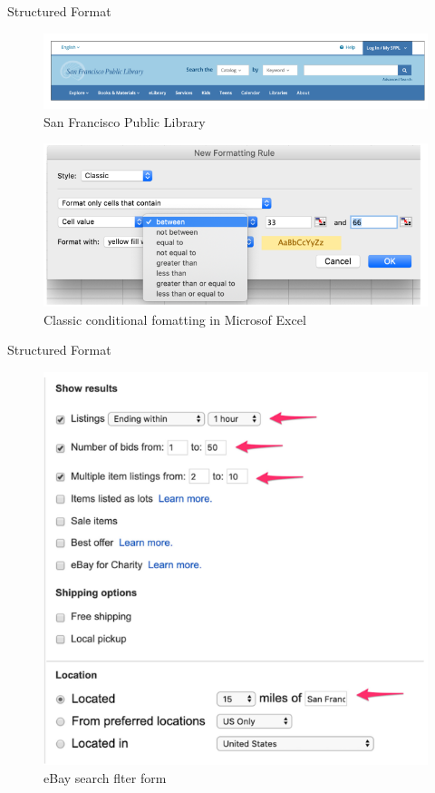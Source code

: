 \documentclass{beamer}
\begin{document}
\begin{frame}[t]{Structured Format}
	\begin{figure}[h]
		\centering
		\includegraphics[scale=0.4]{images/lec08-pic37.png}
		\caption{San Francisco Public Library}
	\end{figure}

	\begin{figure}[h]
		\centering
		\includegraphics[scale=0.4]{images/lec08-pic38.png}
		\caption{Classic conditional fomatting in Microsof Excel}
	\end{figure}
\end{frame}

\begin{frame}[t]{Structured Format}
	\begin{figure}[h]
		\centering
		\includegraphics[scale=0.4]{images/lec08-pic40.png}
		\caption{eBay search flter form}
	\end{figure}
\end{frame}
\end{document}
